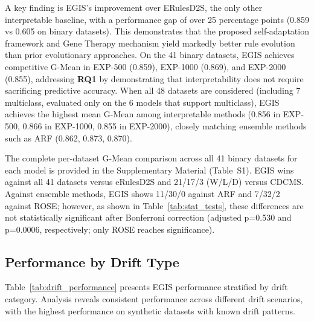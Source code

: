 \documentclass[lettersize,journal]{IEEEtran}
\begin{document}
A key finding is EGIS's improvement over ERulesD2S, the only other interpretable baseline, with a performance gap of over 25 percentage points (0.859 vs 0.605 on binary datasets). This demonstrates that the proposed self-adaptation framework and Gene Therapy mechanism yield markedly better rule evolution than prior evolutionary approaches. On the 41 binary datasets, EGIS achieves competitive G-Mean in EXP-500 (0.859), EXP-1000 (0.869), and EXP-2000 (0.855), addressing \textbf{RQ1} by demonstrating that interpretability does not require sacrificing predictive accuracy. When all 48 datasets are considered (including 7 multiclass, evaluated only on the 6 models that support multiclass), EGIS achieves the highest mean G-Mean among interpretable methods (0.856 in EXP-500, 0.866 in EXP-1000, 0.855 in EXP-2000), closely matching ensemble methods such as ARF (0.862, 0.873, 0.870).

The complete per-dataset G-Mean comparison across all 41 binary datasets for each model is provided in the Supplementary Material (Table~S1). EGIS wins against all 41 datasets versus eRulesD2S and 21/17/3 (W/L/D) versus CDCMS. Against ensemble methods, EGIS shows 11/30/0 against ARF and 7/32/2 against ROSE; however, as shown in Table~\ref{tab:stat_tests}, these differences are not statistically significant after Bonferroni correction (adjusted p=0.530 and p=0.0006, respectively; only ROSE reaches significance).

\subsection{Performance by Drift Type}

Table~\ref{tab:drift_performance} presents EGIS performance stratified by drift category. Analysis reveals consistent performance across different drift scenarios, with the highest performance on synthetic datasets with known drift patterns.
\end{document}

